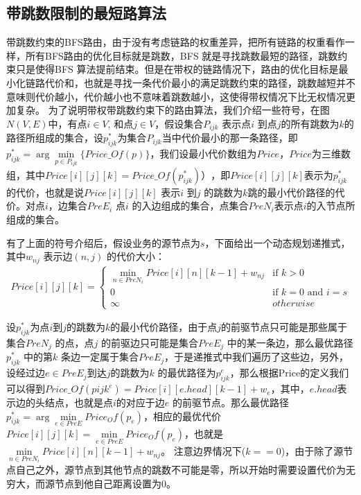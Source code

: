 \subsection{带跳数限制的最短路算法}
带跳数约束的BFS路由，由于没有考虑链路的权重差异，把所有链路的权重看作一样，所有BFS路由的优化目标就是跳数，BFS 就是寻找跳数最短的路径，跳数约束只是使得BFS 算法提前结束。但是在带权的链路情况下，路由的优化目标是最小化链路代价和，也就是寻找一条代价最小的满足跳数约束的路径，跳数越短并不意味则代价越小，代价越小也不意味着跳数越小，这使得带权情况下比无权情况更加复杂。
为了说明带权带跳数约束下的路由算法，我们介绍一些符号，在图$N(V,E)$中，有点$i \in V$, 和点$j \in V$，假设集合$P_{ijk}$ 表示点$i$ 到点$j$的所有跳数为$k$的路径所组成的集合，设$p_{ijk}^*$为集合$P_{ijk}$当中代价最小的那一条路径，即$p_{ijk}^* =\arg\min\limits_{p \in P_{ijk}}\{Price\_Of(p)\}$，我们设最小代价数组为$Price$，$Price$为三维数组，其中$Price[i][j][k]=Price\_Of(p_{ijk}^*) ）$，即$Price[i][j][k]$表示为$p_{ijk}^*$ 的代价，也就是说$Price[i][j][k]$ 表示$i$ 到$j$ 的跳数为$k$跳的最小代价路径的代价。对点$i$，边集合$PreE_i$ 点$i$ 的入边组成的集合，点集合$PreN_i$表示点$i$的入节点所组成的集合。

有了上面的符号介绍后，假设业务的源节点为$s$，下面给出一个动态规划递推式，其中$w_{nj}$ 表示边$(n,j)$ 的代价大小：
\begin{equation}\label{dynamic}
\begin{split}
Price[i][j][k]
=\begin{cases}
\min\limits_{n \in PreN_i}{Price[i][n][k-1]+w_{nj}} & \text{if $k>0$}\\
0 & \text{if $k=0$ and $i=s $} \\
\infty &{otherwise}
\end{cases}
\end{split}
\end{equation}

设$p_{ijk}^*$为点$i$到$j$的跳数为$k$的最小代价路径，由于点$j$的前驱节点只可能是那些属于集合$PreN_j$ 的点，点$j$ 的前驱边只可能是集合$PreE_j$ 中的某一条边，那么最优路径$p_{ijk}^*$ 中的第$k$ 条边一定属于集合$PreE_j$，于是递推式中我们遍历了这些边，另外，设经过边$e \in PreE_j$到达$j$的跳数为$k$ 的最优路径为$p_{ijk}^e$，那么根据Price的定义我们可以得到$Price\_Of(p{ijk}^e)=Price[i][e.head][k-1]+w_e$，其中，$e.head$表示边的头结点，也就是点$i$的对应于边$e$ 的前驱节点。那么最优路径$p_{ijk}^*=\arg\min\limits_{e \in PreE}{Price_Of(p_e)}$，相应的最优代价$Price[i][j][k]=\min\limits_{e \in PreE}{Price_Of(p_e)}$，也就是$\min\limits_{n \in PreN_i}{Price[i][n][k-1]+w_{nj}}$。 注意边界情况下($k==0$)，由于除了源节点自己之外，源节点到其他节点的跳数不可能是零，所以开始时需要设置代价为无穷大，而源节点到他自己距离设置为0。


